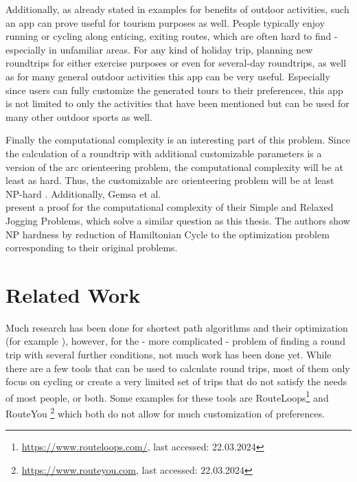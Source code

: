 Additionally, as already stated in examples for benefits of outdoor activities, such an app can prove useful for tourism purposes as well. 
People typically enjoy running or cycling along enticing, exiting routes, which are often hard to find - especially in unfamiliar areas.
For any kind of holiday trip, planning new roundtrips for either exercise purposes or even for several-day roundtrips, as well as for many general outdoor activities this app can be very useful.
Especially since users can fully customize the generated tours to their preferences, this app is not limited to only the activities that have been mentioned but can be used for many other outdoor sports as well.

Finally the computational complexity is an interesting part of this problem. 
Since the calculation of a roundtrip with additional customizable parameters is a version of the arc orienteering problem, the computational complexity will be at least as hard.
Thus, the customizable arc orienteering problem will be at least NP-hard \cite{agarwal_correlated_2023}.
Additionally, Gemsa et al.\\ \cite{gemsa_efficient_2013} present a proof for the computational complexity of their Simple and Relaxed Jogging Problems, which solve a similar question as this thesis.
The authors show NP hardness by reduction of Hamiltonian Cycle to the optimization problem corresponding to their original problems.






\section{Related Work}
\label{sec:relatedWork}


Much research has been done for shortest path algorithms and their optimization (for example \cite{cherkassky_shortest_1996, deo_shortest-path_1984, gallo_shortest_1988, madkour_survey_2017, sommer_shortest-path_2014, wayahdi_greedy_2021}), however, for the - more complicated \cite{gemsa_efficient_2013} - problem of finding a round trip with several further conditions, not much work has been done yet.
While there are a few tools that can be used to calculate round trips, most of them only focus on cycling or create a very limited set of trips that do not satisfy the needs of most people, or both. 
Some examples for these tools are RouteLoops\footnote{\url{https://www.routeloops.com/}, last accessed: 22.03.2024} and RouteYou \footnote{\url{https://www.routeyou.com}, last accessed: 22.03.2024} which both do not allow for much customization of preferences. 

